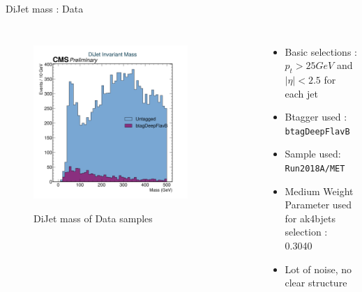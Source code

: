 \documentclass[10pt,xcolor=dvipsnames,aspectratio=169]{beamer}
\begin{document}
    
   \begin{frame}[fragile]{DiJet mass : Data} 
    \begin{columns}
    \begin{figure} 
    \centering 
     \includegraphics[width=0.8\textwidth]{../Archive/KinemPlots/DiJetsData.png }
    \label{DiJetData} 
    \caption{DiJet mass of Data samples}
    \end{figure} 
    \begin{itemize} 
    \raggedright 
    \small
    \item Basic selections : $p_t > 25 GeV $ and $|\eta | < 2.5 $ for each jet
    \item {Btagger used : \texttt{btagDeepFlavB}} 
    \item {Sample used: \texttt{Run2018A/MET}} 
    \item Medium Weight Parameter used for ak4bjets selection : 0.3040
    \item Lot of noise, no clear structure 
    \end{itemize}
    \end{columns} 
    \end{frame} 
    
\end{document}
